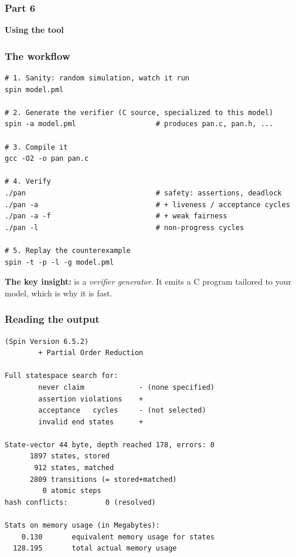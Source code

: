 \begin{frame}
  \frametitle{Part 6}

{\Large\bf Using the tool}

\end{frame}

\begin{frame}[fragile]
  \frametitle{The workflow} \small

\begin{lstlisting}[style=shell]
# 1. Sanity: random simulation, watch it run
spin model.pml

# 2. Generate the verifier (C source, specialized to this model)
spin -a model.pml                   # produces pan.c, pan.h, ...

# 3. Compile it
gcc -O2 -o pan pan.c

# 4. Verify
./pan                               # safety: assertions, deadlock
./pan -a                            # + liveness / acceptance cycles
./pan -a -f                         # + weak fairness
./pan -l                            # non-progress cycles

# 5. Replay the counterexample
spin -t -p -l -g model.pml
\end{lstlisting}

\pause
\vspace{0.2cm}

{\bf The key insight:} \spin{} is a {\em verifier generator}. It emits a C program
tailored to your model, which is why it is fast.

\end{frame}

\begin{frame}[fragile]
  \frametitle{Reading the output} \small

\begin{lstlisting}[style=shell]
(Spin Version 6.5.2)
        + Partial Order Reduction

Full statespace search for:
        never claim             - (none specified)
        assertion violations    +
        acceptance   cycles     - (not selected)
        invalid end states      +

State-vector 44 byte, depth reached 178, errors: 0
      1897 states, stored
       912 states, matched
      2809 transitions (= stored+matched)
         0 atomic steps
hash conflicts:         0 (resolved)

Stats on memory usage (in Megabytes):
    0.130       equivalent memory usage for states
  128.195       total actual memory usage
\end{lstlisting}

\end{frame}

